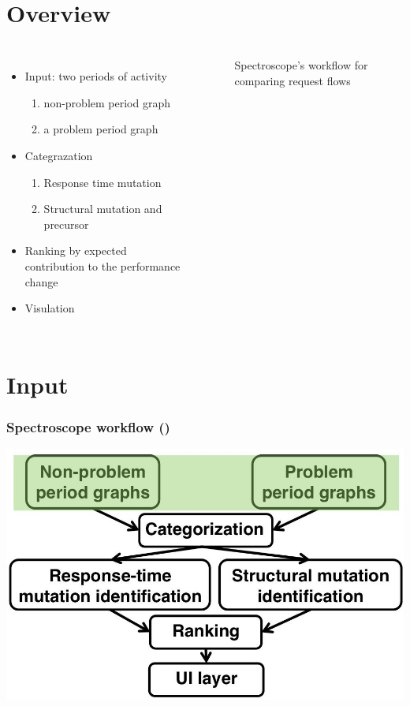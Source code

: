 \documentclass[11pt]{beamer}
\begin{document}
\section{Overview}
\begin{frame}
\frametitle{\secname}
\begin{columns}
\begin{itemize}
  \item Input: two periods of activity
  \begin{enumerate}
    \item non-problem period graph
    \item a problem period graph
  \end{enumerate}
  \item Categrazation
  \begin{enumerate}
    \item Response time mutation
    \item Structural mutation and precursor
  \end{enumerate}
  \item Ranking by expected contribution to the performance change
  \item Visulation
\end{itemize}
\begin{figure}[htbp]
\centering
\caption{Spectroscope's workflow for comparing request flows}
\label{fig:workflow}
\end{figure}
\end{columns}
\end{frame}

\section{Input}

\begin{frame}
\frametitle{Spectroscope workflow ()}
\includegraphics[width=\textwidth]{fig/work1.jpg}
\end{frame}
\end{document}
